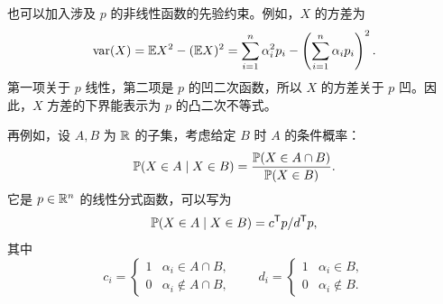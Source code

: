 也可以加入涉及 $p$ 的非线性函数的先验约束。例如，$X$ 的方差为
\[
 \operatorname{var}(X)=\mathbb E X^2-(\mathbb E X)^2
 =\sum_{i=1}^n\alpha_i^2p_i-\left(\sum_{i=1}^n\alpha_ip_i\right)^2.
\]
第一项关于 $p$ 线性，第二项是 $p$ 的凹二次函数，所以 $X$ 的方差关于 $p$ 凹。因此，$X$ 方差的下界能表示为 $p$ 的凸二次不等式。

再例如，设 $A,B$ 为 $\mathbb R$ 的子集，考虑给定 $B$ 时 $A$ 的条件概率：
\[
 \mathbb P(X\in A\mid X\in B)=\frac{\mathbb P(X\in A\cap B)}{\mathbb P(X\in B)}.
\]
它是 $p\in\mathbb R^n$ 的线性分式函数，可以写为
\[
 \mathbb P(X\in A\mid X\in B)=c^{\mathsf T}p/d^{\mathsf T}p,
\]
其中
\[
 c_i=\begin{cases}1&\alpha_i\in A\cap B,\\0&\alpha_i\notin A\cap B,\end{cases}
 \qquad
 d_i=\begin{cases}1&\alpha_i\in B,\\0&\alpha_i\notin B.\end{cases}
\]
